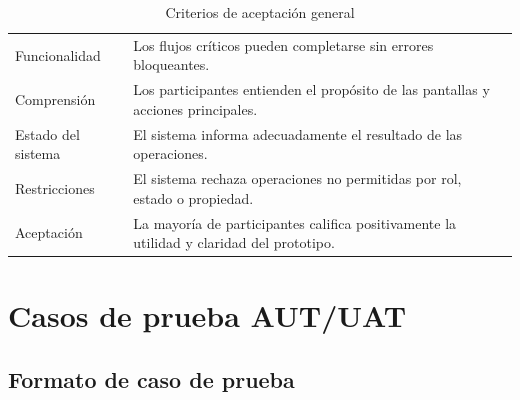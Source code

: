 \documentclass[12pt,letterpaper]{article}
\begin{document}
\begin{table}[H]
\centering
\begingroup
\footnotesize
\setlength{\tabcolsep}{3pt}
\renewcommand{\arraystretch}{1.25}

\begin{tabularx}{\textwidth}{|
>{\raggedright\arraybackslash}p{3.4cm}|
>{\raggedright\arraybackslash}X|}
\hline
\multicolumn{1}{|>{\centering\arraybackslash}m{3.4cm}|}{\textbf{Categoría}} &
\multicolumn{1}{>{\centering\arraybackslash}m{10.8cm}|}{\textbf{Criterio}} \\
\hline
Funcionalidad & Los flujos críticos pueden completarse sin errores bloqueantes. \\
\hline
Comprensión & Los participantes entienden el propósito de las pantallas y acciones principales. \\
\hline
Estado del sistema & El sistema informa adecuadamente el resultado de las operaciones. \\
\hline
Restricciones & El sistema rechaza operaciones no permitidas por rol, estado o propiedad. \\
\hline
Aceptación & La mayoría de participantes califica positivamente la utilidad y claridad del prototipo. \\
\hline
\end{tabularx}

\endgroup
\caption{Criterios de aceptación general}
\label{tab:criterios-aceptacion-general}
\end{table}

\section{Casos de prueba AUT/UAT}

\subsection{Formato de caso de prueba}
\end{document}
